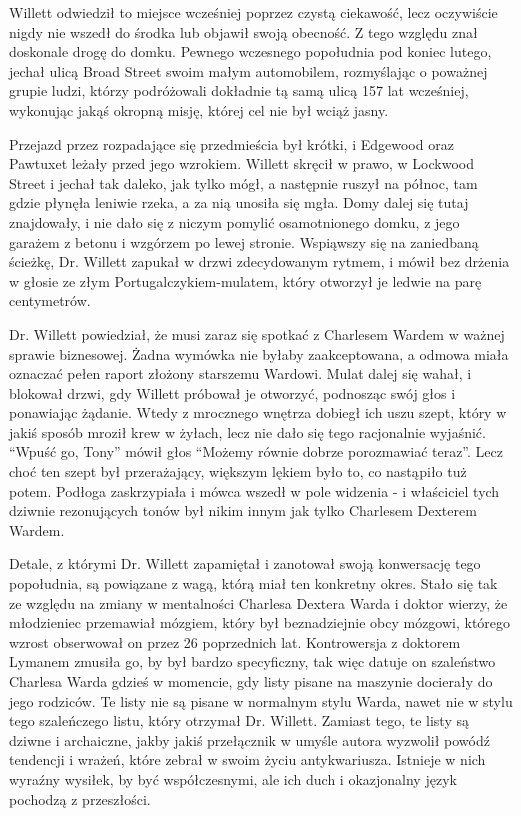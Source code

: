Willett odwiedził to miejsce wcześniej poprzez czystą ciekawość, lecz oczywiście nigdy nie wszedł do środka lub objawił swoją obecność. Z tego względu znał doskonale drogę do domku. Pewnego wczesnego popołudnia pod koniec lutego, jechał ulicą Broad Street swoim małym automobilem, rozmyślając o poważnej grupie ludzi, którzy podróżowali dokładnie tą samą ulicą 157 lat wcześniej, wykonując jakąś okropną misję, której cel nie był wciąż jasny. 

Przejazd przez rozpadające się przedmieścia był krótki, i Edgewood oraz  Pawtuxet leżały przed jego wzrokiem. Willett skręcił w prawo, w Lockwood Street i jechał tak daleko, jak tylko mógł, a następnie ruszył na północ, tam gdzie płynęła leniwie rzeka, a za nią unosiła się mgła. Domy dalej się tutaj znajdowały, i nie dało się z niczym pomylić osamotnionego domku, z jego garażem z betonu i wzgórzem po lewej stronie. Wspiąwszy się na zaniedbaną ścieżkę, Dr. Willett zapukał w drzwi zdecydowanym rytmem, i mówił bez drżenia w głosie ze złym Portugalczykiem-mulatem, który otworzył je ledwie na parę centymetrów. 

Dr. Willett powiedział, że musi zaraz się spotkać z Charlesem Wardem w ważnej sprawie biznesowej. Żadna wymówka nie byłaby zaakceptowana, a odmowa miała oznaczać pełen raport złożony starszemu Wardowi. Mulat dalej się wahał, i blokował drzwi, gdy Willett próbował je otworzyć, podnosząc swój głos i ponawiając żądanie. Wtedy z mrocznego wnętrza dobiegł ich uszu szept, który w jakiś sposób mroził krew w żyłach, lecz nie dało się tego racjonalnie wyjaśnić. ``Wpuść go, Tony'' mówił głos ``Możemy równie dobrze porozmawiać teraz''. Lecz choć ten szept był przerażający, większym lękiem było to, co nastąpiło tuż potem. Podłoga zaskrzypiała i mówca wszedł w pole widzenia - i właściciel tych dziwnie rezonujących tonów był nikim innym jak tylko Charlesem Dexterem Wardem.   

Detale, z którymi Dr. Willett zapamiętał i zanotował swoją konwersację tego popołudnia, są powiązane z wagą, którą miał ten konkretny okres. Stało się tak ze względu na zmiany w mentalności Charlesa Dextera Warda i doktor wierzy, że młodzieniec przemawiał mózgiem, który był beznadziejnie obcy mózgowi, którego wzrost obserwował on przez 26 poprzednich lat. Kontrowersja z doktorem Lymanem zmusiła go, by był bardzo specyficzny, tak więc datuje on szaleństwo Charlesa Warda gdzieś w momencie, gdy listy pisane na maszynie docierały do jego rodziców. Te listy nie są pisane w normalnym stylu Warda, nawet nie w stylu tego szaleńczego listu, który otrzymał Dr. Willett.  Zamiast tego, te listy są dziwne i archaiczne, jakby jakiś przełącznik w umyśle autora wyzwolił powódź tendencji i wrażeń, które zebrał w swoim życiu antykwariusza. Istnieje w nich wyraźny wysiłek, by być współczesnymi, ale ich duch i okazjonalny język pochodzą z przeszłości.

